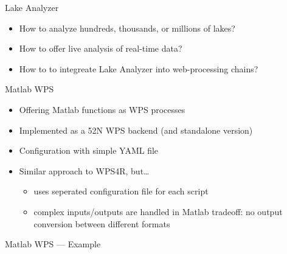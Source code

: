 \documentclass[xcolor=svgnames,professionalfonts,11pt,aspectratio=43]{beamer}
\begin{document}
\begin{frame}[c]{Lake Analyzer}
  \begin{itemize}
    \item How to analyze hundreds, thousands, or millions of lakes?
    \pause
    \item How to offer live analysis of real-time data?
    \pause
    \item How to to integreate Lake Analyzer into web-processing chains?
  \end{itemize}
\end{frame}


\begin{frame}[t]{Matlab WPS}
  \begin{itemize}
    \item Offering Matlab functions as WPS processes
    \pause
    \item Implemented as a 52\textdegree{}N WPS backend (and standalone version)
    \pause
    \item Configuration with simple YAML file
    \pause
    \item Similar approach to WPS4R, but\dots
    \pause
    \begin{itemize}
      \item uses seperated configuration file for each script
      \pause
      \item complex inputs/outputs are handled in Matlab
      \pause
      \arrow tradeoff: no output conversion between different formats
    \end{itemize}
  \end{itemize}
\end{frame}

\begin{frame}[fragile]{Matlab WPS --- Example}
  \begin{columns}
    
    \pause
    
    \pause
    
  \end{columns}
\end{frame}
\end{document}
